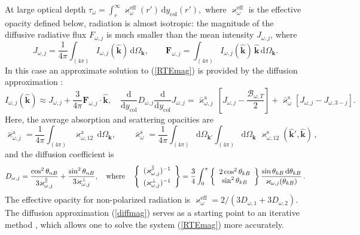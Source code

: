 \documentclass{pos1}
\newcommand{\beq}{\begin{equation}}
\newcommand{\eeq}{\end{equation}}
\newcommand{\dd}{\mathrm{d}}
\newcommand{\khat}{\hat{\mathbf{k}}}
\newcommand{\Omk}[1]{\Omega_{#1}}
\newcommand{\opac}{\varkappa}
\newcommand{\ycol}{y_\mathrm{col}}
\begin{document}
At large optical depth 
$
   \tau_\omega =
\int_r^\infty \opac_\omega^\mathrm{eff}(r') \, \dd \ycol(r'),
$
where $\opac_\omega^\mathrm{eff}$ is the effective opacity defined
below, radiation is almost isotropic: the magnitude of the diffusive
radiative flux $F_{\omega,j}$
is much smaller than the mean intensity $J_{\omega,j}$, where
\beq
J_{\omega,j} =
\frac{1}{4\pi}\int_{(4\pi)}I_{\omega,j}(\khat)\,\dd\Omk{\bm{k}},
\qquad
    \bm{F}_{\omega,j}=\int_{(4\pi)}
         I_{\omega,j}(\khat)\,\khat\,\dd\Omk{\bm{k}}.
\eeq
In this case an approximate solution to (\ref{RTEmag}) is provided by
the diffusion approximation \cite{KaminkerPS82}:
\beq
I_{\omega,j}(\khat)\approx J_{\omega,j} +
\frac{3}{4\pi}\bm{F}_{\omega,j}\cdot\khat,
\quad
   \frac{\dd}{\dd\ycol}
D_{\omega,j}
         \frac{\dd}{\dd\ycol} J_{\omega,j} =
        \bar{\opac}_{\omega,j}^\mathrm{a}\,
       \left[ J_{\omega,j} -
           \frac{\mathcal{B}_{\omega,T}}{2} \right]
+
 \bar{\opac}_{\omega}^\mathrm{s}
        \left[J_{\omega,j} - J_{\omega,3-j} \right].
\label{diffmag}
\end{equation}
Here, the average absorption and scattering opacities are
\beq
   \bar{\opac}_{\omega,j}^\mathrm{a} = \frac{1}{4\pi}\int_{(4\pi)}
\opac_{\omega,12}^\mathrm{a}\,\dd\Omk{\bm{k}},
\qquad
\bar{\opac}_{\omega}^\mathrm{s} = \frac{1}{4\pi}
\int_{(4\pi)}\dd\Omk{\bm{k}'}
\int_{(4\pi)} \dd\Omk{\bm{k}}\,\,
\opac_{\omega,12}^\mathrm{s}(\khat',\khat) \, ,
\eeq
and the diffusion coefficient is
\beq
   D_{\omega,j} = 
\frac{\cos^2\theta_{nB}}{3\opac_{\omega,j}^\|} +
\frac{\sin^2\theta_{nB}}{3\opac_{\omega,j}^\perp},
\quad\mbox{where}\quad
\left\{
   \begin{array}{c}
 (\opac_{\omega,j}^\|)^{-1}
\\
   (\opac_{\omega,j}^{\perp})^{-1\rule{0pt}{2ex}}
   \end{array}
  \right\}
 = \frac34 \int_0^\pi
\left\{
   \begin{array}{c}
2\cos^2\theta_{kB} \\
\sin^2\theta_{kB}
\end{array}
  \right\}
\frac{\sin\theta_{kB}\,\mathrm{d}\theta_{kB}}{\opac_{\omega,j}(\theta_{kB})}\,.
\label{kappa-eff}
\eeq
The effective opacity for non-polarized
radiation is
$
\opac_\omega^\mathrm{eff}={2}/(3D_{\omega,1}+3D_{\omega,2}).
$
The diffusion approximation (\ref{diffmag}) serves as a
starting point to an iterative method \cite{SZ95}, which
allows one to solve the system (\ref{RTEmag})
more accurately.
\end{document}

